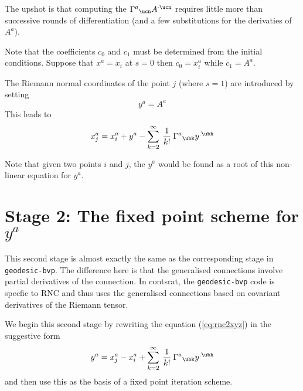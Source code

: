\documentclass[12pt]{cdblatex}
\begin{document}
The upshot is that computing the $\Gamma^{a}{}_{\ucn} A^{\cdot\ucn}$ requires little more than
successive rounds of differentiation (and a few substitutions for the derivaties of $A^{a}$).

Note that the coefficients $c_0$ and $c_1$ must be determined from the initial conditions.
Suppose that $x^a=x_i$ at $s=0$ then $c_0=x^a_i$ while $c_1 = A^{a}$.

The Riemann normal coordinates of the point $j$ (where $s=1$) are introduced by setting
\begin{equation}
   y^{a} = A^{a}
\end{equation}
This leads to
\begin{equation}
   \label{eq:rnc2xyz}
   x^{a}_j = x^{a}_i + y^{a} - \sum_{k=2}^\infty\>\frac{1}{k!}\>\Gamma^{a}{}_{\ubk}y^{.\ubk}
\end{equation}

Note that given two points $i$ and $j$, the $y^{a}$ would be found as a root of this
non-linear equation for $y^a$.

\section*{Stage 2: The fixed point scheme for $y^a$}

This second stage is almost exactly the same as the corresponding stage in {\tt geodesic-bvp}.
The difference here is that the generalised connections involve partial derivatives of the
connection. In contsrat, the {\tt geodesic-bvp} code is specfic to RNC and thus uses the
generalised connections based on covariant derivatives of the Riemann tensor.

We begin this second stage by rewriting the equation (\ref{eq:rnc2xyz}) in the suggestive form
\begin{align*}
y^a = x^a_j-x^a_i + \sum_{k=2}^\infty\>\frac{1}{k!}\>\Gamma^{a}{}_{\ubk}y^{.\ubk}
\end{align*}
and then use this as the basis of a fixed point iteration scheme.
\end{document}
